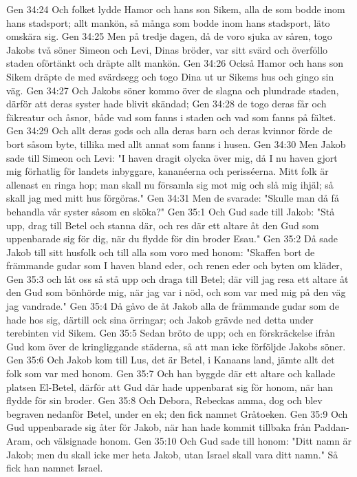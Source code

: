 Gen 34:24  Och folket lydde Hamor och hans son Sikem, alla de som bodde inom hans stadsport; allt mankön, så många som bodde inom hans stadsport, läto omskära sig.
Gen 34:25  Men på tredje dagen, då de voro sjuka av såren, togo Jakobs två söner Simeon och Levi, Dinas bröder, var sitt svärd och överföllo staden oförtänkt och dräpte allt mankön.
Gen 34:26  Också Hamor och hans son Sikem dräpte de med svärdsegg och togo Dina ut ur Sikems hus och gingo sin väg.
Gen 34:27  Och Jakobs söner kommo över de slagna och plundrade staden, därför att deras syster hade blivit skändad;
Gen 34:28  de togo deras får och fäkreatur och åsnor, både vad som fanns i staden och vad som fanns på fältet.
Gen 34:29  Och allt deras gods och alla deras barn och deras kvinnor förde de bort såsom byte, tillika med allt annat som fanns i husen.
Gen 34:30  Men Jakob sade till Simeon och Levi: "I haven dragit olycka över mig, då I nu haven gjort mig förhatlig för landets inbyggare, kananéerna och perisséerna. Mitt folk är allenast en ringa hop; man skall nu församla sig mot mig och slå mig ihjäl; så skall jag med mitt hus förgöras."
Gen 34:31  Men de svarade: "Skulle man då få behandla vår syster såsom en sköka?"
Gen 35:1  Och Gud sade till Jakob: "Stå upp, drag till Betel och stanna där, och res där ett altare åt den Gud som uppenbarade sig för dig, när du flydde för din broder Esau."
Gen 35:2  Då sade Jakob till sitt husfolk och till alla som voro med honom: "Skaffen bort de främmande gudar som I haven bland eder, och renen eder och byten om kläder,
Gen 35:3  och låt oss så stå upp och draga till Betel; där vill jag resa ett altare åt den Gud som bönhörde mig, när jag var i nöd, och som var med mig på den väg jag vandrade."
Gen 35:4  Då gåvo de åt Jakob alla de främmande gudar som de hade hos sig, därtill ock sina örringar; och Jakob grävde ned detta under terebinten vid Sikem.
Gen 35:5  Sedan bröto de upp; och en förskräckelse ifrån Gud kom över de kringliggande städerna, så att man icke förföljde Jakobs söner.
Gen 35:6  Och Jakob kom till Lus, det är Betel, i Kanaans land, jämte allt det folk som var med honom.
Gen 35:7  Och han byggde där ett altare och kallade platsen El-Betel, därför att Gud där hade uppenbarat sig för honom, när han flydde för sin broder.
Gen 35:8  Och Debora, Rebeckas amma, dog och blev begraven nedanför Betel, under en ek; den fick namnet Gråtoeken.
Gen 35:9  Och Gud uppenbarade sig åter för Jakob, när han hade kommit tillbaka från Paddan-Aram, och välsignade honom.
Gen 35:10  Och Gud sade till honom: "Ditt namn är Jakob; men du skall icke mer heta Jakob, utan Israel skall vara ditt namn." Så fick han namnet Israel.

